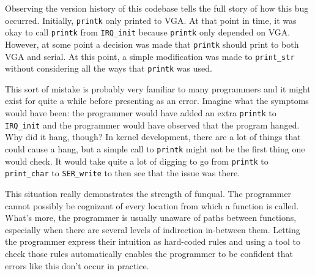 Observing the version history of this codebase tells the full story of how this bug occurred.  Initially, \lstinline{printk} only printed to VGA.  At that point in time, it was okay to call \lstinline{printk} from \lstinline{IRQ_init} because \lstinline{printk} only depended on VGA.  However, at some point a decision was made that \lstinline{printk} should print to both VGA and serial.  At this point, a simple modification was made to \lstinline{print_str} without considering all the ways that \lstinline{printk} was used. 

This sort of mistake is probably very familiar to many programmers and it might exist for quite a while before presenting as an error.  Imagine what the symptoms would have been: the programmer would have added an extra \lstinline{printk} to \lstinline{IRQ_init} and the programmer would have observed that the program hanged.  Why did it hang, though?  In kernel development, there are a lot of things that could cause a hang, but a simple call to \lstinline{printk} might not be the first thing one would check.  It would take quite a lot of digging to go from \lstinline{printk} to \lstinline{print_char} to \lstinline{SER_write} to then see that the issue was there.  

This situation really demonstrates the strength of funqual.  The programmer cannot possibly be cognizant of every location from which a function is called.  What's more, the programmer is usually unaware of paths between functions, especially when there are several levels of indirection in-between them.  Letting the programmer express their intuition as hard-coded rules and using a tool to check those rules automatically enables the programmer to be confident that errors like this don't occur in practice.  
